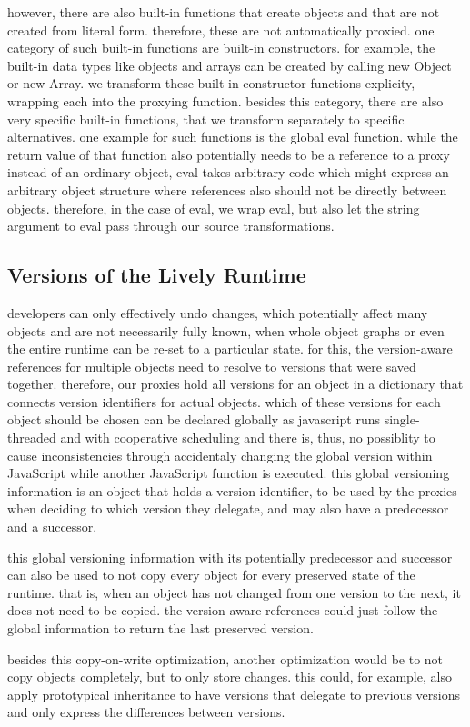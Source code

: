 however, there are also built-in functions that create objects and that are not created from literal form.
therefore, these are not automatically proxied.
one category of such built-in functions are built-in constructors.
for example, the built-in data types like objects and arrays can be created by calling new Object or new Array.
we transform these built-in constructor functions explicity, wrapping each into the proxying function.
besides this category, there are also very specific built-in functions, that we transform separately to specific alternatives.
one example for such functions is the global eval function.
while the return value of that function also potentially needs to be a reference to a proxy instead of an ordinary object, eval takes arbitrary code which might express an arbitrary object structure where references also should not be directly between objects.
therefore, in the case of eval, we wrap eval, but also let the string argument to eval pass through our source transformations.


\subsection{Versions of the Lively Runtime}

developers can only effectively undo changes, which potentially affect many objects and are not necessarily fully known, when whole object graphs or even the entire runtime can be re-set to a particular state.
for this, the version-aware references for multiple objects need to resolve to versions that were saved together.
therefore, our proxies hold all versions for an object in a dictionary that connects version identifiers for actual objects.
which of these versions for each object should be chosen can be declared globally as javascript runs single-threaded and with cooperative scheduling and there is, thus, no possiblity to cause inconsistencies through accidentaly changing the global version within JavaScript while another JavaScript function is executed.
this global versioning information is an object that holds a version identifier, to be used by the proxies when deciding to which version they delegate, and may also have a predecessor and a successor.

this global versioning information with its potentially predecessor and successor can also be used to not copy every object for every preserved state of the runtime.
that is, when an object has not changed from one version to the next, it does not need to be copied.
the version-aware references could just follow the global information to return the last preserved version.

besides this copy-on-write optimization, another optimization would be to not copy objects completely, but to only store changes.
this could, for example, also apply prototypical inheritance to have versions that delegate to previous versions and only express the differences between versions.
